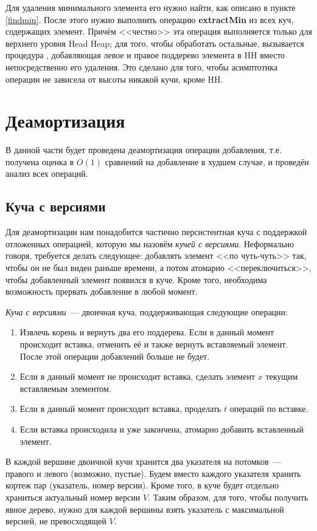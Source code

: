 Для удаления минимального элемента его нужно найти, как описано в пункте \ref{findmin}.
После этого нужно выполнить операцию \textbf{extractMin} из всех куч, содержащих элемент.
Причём <<честно>> эта операция выполняется только для верхнего уровня Head Heap; для
того, чтобы обработать остальные, вызывается процедура \Yield, добавляющая левое
и правое поддерево элемента в HH вместо непосредственно его удаления. Это сделано
для того, чтобы асимптотика операции не зависела от высоты никакой кучи, кроме HH.


\section{Деамортизация}
В данной части будет проведена деамортизация операции добавления, т.е. получена
оценка в $O(1)$ сравнений на добавление в худшем случае, и проведён анализ всех
операций.

\subsection{Куча с версиями}
Для деамортизации нам понадобится частично персистентная куча с поддержкой
отложенных операцией, которую мы назовём \emph{кучей с версиями}.
Неформально говоря, требуется делать следующее: добавлять элемент <<по чуть-чуть>>
так, чтобы он не был виден раньше времени, а потом атомарно <<переключиться>>,
чтобы добавленный элемент появился в куче. Кроме того, необходима возможность
прервать добавление в любой момент.

\begin{definition}
\emph{Куча с версиями}~--- двоичная куча, поддерживающая следующие операции:
\begin{enumerate}
\item Извлечь корень и вернуть два его поддерева. Если в данный момент происходит
    вставка, отменить её и также вернуть вставляемый элемент. После этой операции
    добавлений больше не будет.
\item Если в данный момент не происходит вставка, сделать элемент $x$
    текущим вставляемым элементом.
\item Если в данный момент происходит вставка, проделать $t$ операций по вставке.
\item Если вставка происходила и уже закончена, атомарно добавить вставленный элемент.
\end{enumerate}
\end{definition}

В каждой вершине двоичной кучи хранится два указателя на потомков~--- правого
и левого (возможно, пустые). Будем вместо каждого указателя хранить кортеж
пар (указатель, номер версии). Кроме того, в куче будет отдельно храниться
актуальный номер версии $V$. Таким образом, для того, чтобы получить явное дерево,
нужно для каждой вершины взять указатель с максимальной версией, не превосходящей
$V$.


